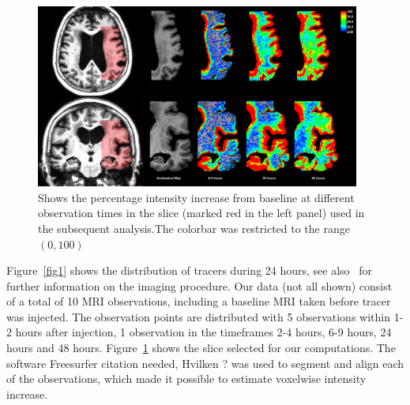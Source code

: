\documentclass[11pt,a4paper]{article}
\begin{document}
\begin{figure}
\includegraphics[width=0.95\textwidth]{Zoom-PatID-68.png} 
\caption{Shows the percentage intensity increase from baseline at different observation times in the slice (marked red in the left panel) used in the subsequent analysis.The colorbar was restricted to the range $(0,100)$}
\label{fig2} 
\end{figure}
Figure~\ref{fig1} shows the distribution of tracers during 24 hours, see also~\cite{ringstad2018brain} for further information on the imaging procedure.   
Our data (not all shown) consist of a total of 10 MRI observations, including a baseline MRI taken before tracer was injected. The observation points are distributed with 5 observations within 1-2 hours after injection, 1 observation in the timeframes 2-4 hours, 6-9 hours, 24 hours and 48 hours. 
Figure~\ref{fig2} shows the slice selected for our computations. 
The software Freesurfer {\color{red} citation needed, Hvilken ? } was used to segment and align each of the observations, which made it possible to estimate voxelwise intensity increase. 
\end{document}
